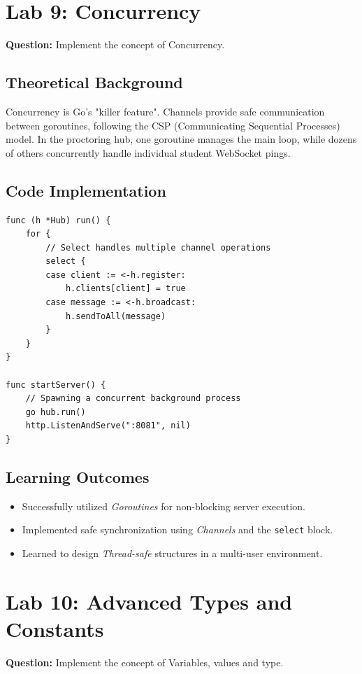 \documentclass[12pt,a4paper]{article}
\begin{document}
\newpage
\section{Lab 9: Concurrency}
\textbf{Question:} Implement the concept of Concurrency.

\subsection{Theoretical Background}
Concurrency is Go's "killer feature". Channels provide safe communication between goroutines, following the CSP (Communicating Sequential Processes) model. In the proctoring hub, one goroutine manages the main loop, while dozens of others concurrently handle individual student WebSocket pings.

\subsection{Code Implementation}
\begin{lstlisting}
func (h *Hub) run() {
	for {
        // Select handles multiple channel operations
		select {
		case client := <-h.register:
			h.clients[client] = true
		case message := <-h.broadcast:
			h.sendToAll(message)
		}
	}
}

func startServer() {
    // Spawning a concurrent background process
    go hub.run()
    http.ListenAndServe(":8081", nil)
}
\end{lstlisting}

\subsection{Learning Outcomes}
\begin{itemize}
    \item Successfully utilized \textit{Goroutines} for non-blocking server execution.
    \item Implemented safe synchronization using \textit{Channels} and the \texttt{select} block.
    \item Learned to design \textit{Thread-safe} structures in a multi-user environment.
\end{itemize}

\newpage
\section{Lab 10: Advanced Types and Constants}
\textbf{Question:} Implement the concept of Variables, values and type.
\end{document}
